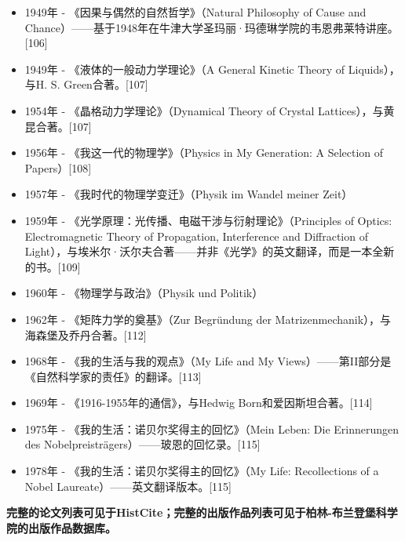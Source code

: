 \begin{itemize}
\item 1949年 - 《因果与偶然的自然哲学》（Natural Philosophy of Cause and Chance）——基于1948年在牛津大学圣玛丽·玛德琳学院的韦恩弗莱特讲座。[106]  
\item 1949年 - 《液体的一般动力学理论》（A General Kinetic Theory of Liquids），与H. S. Green合著。[107]  
\item 1954年 - 《晶格动力学理论》（Dynamical Theory of Crystal Lattices），与黄昆合著。[107]  
\item 1956年 - 《我这一代的物理学》（Physics in My Generation: A Selection of Papers）[108]  
\item 1957年 - 《我时代的物理学变迁》（Physik im Wandel meiner Zeit）  
\item 1959年 - 《光学原理：光传播、电磁干涉与衍射理论》（Principles of Optics: Electromagnetic Theory of Propagation, Interference and Diffraction of Light），与埃米尔·沃尔夫合著——并非《光学》的英文翻译，而是一本全新的书。[109]  
\item 1960年 - 《物理学与政治》（Physik und Politik）  
\item 1962年 - 《矩阵力学的奠基》（Zur Begründung der Matrizenmechanik），与海森堡及乔丹合著。[112]  
\item 1968年 - 《我的生活与我的观点》（My Life and My Views）——第II部分是《自然科学家的责任》的翻译。[113]  
\item 1969年 - 《1916-1955年的通信》，与Hedwig Born和爱因斯坦合著。[114]  
\item 1975年 - 《我的生活：诺贝尔奖得主的回忆》（Mein Leben: Die Erinnerungen des Nobelpreisträgers）——玻恩的回忆录。[115]  
\item 1978年 - 《我的生活：诺贝尔奖得主的回忆》（My Life: Recollections of a Nobel Laureate）——英文翻译版本。[115] 
\end{itemize} 

\textbf{完整的论文列表可见于HistCite；完整的出版作品列表可见于柏林-布兰登堡科学院的出版作品数据库。}